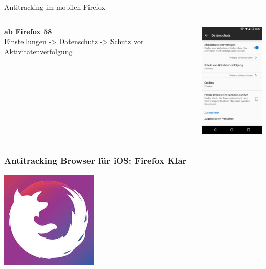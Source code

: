 \begin{frame}{Antitracking im mobilen Firefox}
	\begin{columns}
		\column{5.5cm}
		\footnotesize
		\textbf{ab Firefox 58}\\
		Einstellungen -> Datenschutz -> Schutz vor Aktivitätenverfolgung\\
		\vspace{0.5cm}

		\column{5cm}

		\begin{center}
			\includegraphics[width=3.5cm]{../../img/firefox-mobil-antitracking.png}
		\par\end{center}
	\end{columns}
\end{frame}

\begin{frame}
	\frametitle{Antitracking Browser für iOS: Firefox Klar}

	\begin{center}
		\includegraphics[height=0.5\textheight]{../../img/firefox-klar.jpg}
	\end{center}
\end{frame}

